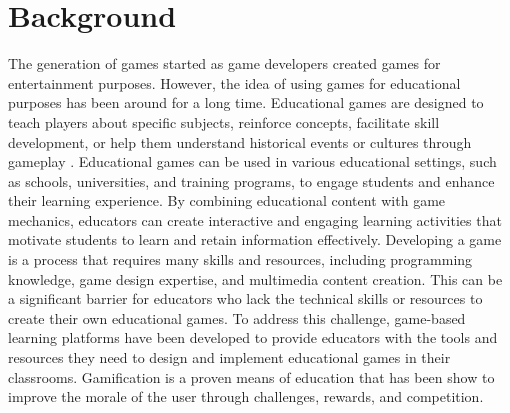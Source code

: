 \chapter{Background}\label{chap:background}
The generation of games started as game developers created games for entertainment purposes. However, the idea of using games for educational purposes has been around for a long time. Educational games are designed to teach players about specific subjects, reinforce concepts, facilitate skill development, or help them understand historical events or cultures through gameplay \cite{crawford1982art}. Educational games can be used in various educational settings, such as schools, universities, and training programs, to engage students and enhance their learning experience. By combining educational content with game mechanics, educators can create interactive and engaging learning activities that motivate students to learn and retain information effectively. Developing a game is a process that requires many skills and resources, including programming knowledge, game design expertise, and multimedia content creation. This can be a significant barrier for educators who lack the technical skills or resources to create their own educational games. To address this challenge, game-based learning platforms have been developed to provide educators with the tools and resources they need to design and implement educational games in their classrooms. Gamification is a proven means of education that has been show to improve the morale of the user through challenges, rewards, and competition. 

